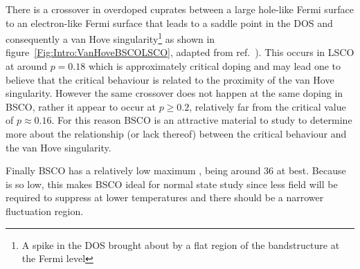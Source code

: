 There is a crossover in overdoped cuprates between a large hole-like Fermi surface to an electron-like Fermi surface that leads to a saddle point in the \ac{DOS} and consequently a van Hove singularity\footnote{A spike in the \ac{DOS} brought about by a flat region of the bandstructure at the Fermi level} as shown in figure~\ref{Fig:Intro:VanHoveBSCOLSCO}, adapted from ref.~\cite{Hashimoto2008}). This occurs in \ac{LSCO} at around $p=0.18$ which is approximately critical doping and may lead one to believe that the critical behaviour is related to the proximity of the van Hove singularity. However the same crossover does not happen at the same doping in \ac{BSCO}, rather it appear to occur at $p \geq 0.2$, relatively far from the critical value of $p \approx 0.16$. For this reason \ac{BSCO} is an attractive material to study to determine more about the relationship (or lack thereof) between the critical behaviour and the van Hove singularity.

Finally \ac{BSCO} has a relatively low maximum \Tc, being around \unit{36}{\kelvin} at best. Because \Tc is so low, this makes \ac{BSCO} ideal for normal state study since less field will be required to suppress \Tc at lower temperatures and there should be a narrower fluctuation region.
